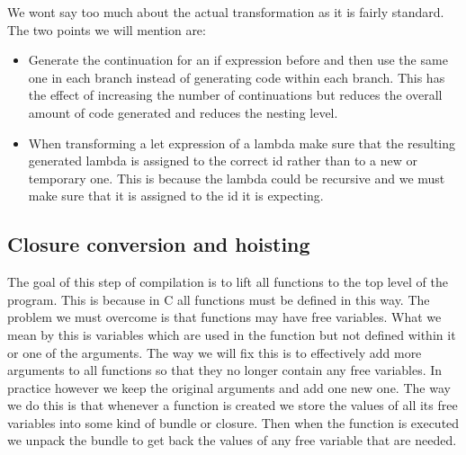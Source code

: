 \documentclass[a4paper]{article}
\begin{document}
We wont say too much about the actual transformation as it is fairly standard. The two points we will mention are:
\begin{itemize}
\item
	Generate the continuation for an if expression before and then use the same one in each branch instead of generating code within each branch. This has the effect of increasing the number of continuations but reduces the overall amount of code generated and reduces the nesting level.

\item
	When transforming a let expression of a lambda make sure that the resulting generated lambda is assigned to the correct id rather than to a new or temporary one. This is because the lambda could be recursive and we must make sure that it is assigned to the id it is expecting. 

\end{itemize}




\subsection{Closure conversion and hoisting}

The goal of this step of compilation is to lift all functions to the top level of the program. This is because in C all functions must be defined in this way. The problem we must overcome is that functions may have free variables. What we mean by this is variables which are used in the function but not defined within it or one of the arguments. The way we will fix this is to effectively add more arguments to all functions so that they no longer contain any free variables. In practice however we keep the original arguments and add one new one. The way we do this is that whenever a function is created we store the values of all its free variables into some kind of bundle or closure. Then when the function is executed we unpack the bundle to get back the values of any free variable that are needed.
\end{document}
